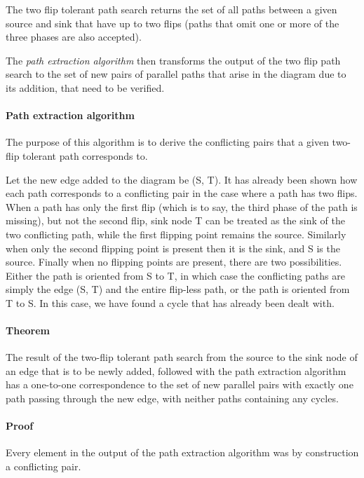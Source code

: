 \documentclass{article}
\begin{document}
The two flip tolerant path search returns the set of all paths between a given source and sink that have up to two flips (paths that omit one or more of the three phases are also accepted).

The \textit{path extraction algorithm} then transforms the output of the two flip path search to the set of new pairs of parallel paths that arise in the diagram due to its addition, that need to be verified.

\paragraph{Path extraction algorithm}
The purpose of this algorithm is to derive the conflicting pairs that a given two-flip tolerant path corresponds to.

Let the new edge added to the diagram be (S, T).
It has already been shown how each path corresponds to a conflicting pair in the case where a path has two flips. When a path has only the first flip (which is to say, the third phase of the path is missing), but not the second flip, sink node T can be treated as the sink of the two conflicting path, while the first flipping point remains the source. Similarly when only the second flipping point is present then it is the sink, and S is the source. Finally when no flipping points are present, there are two possibilities. 
Either the path is oriented from S to T, in which case the conflicting paths are simply the edge (S, T) and the entire flip-less path, or the path is oriented from T to S. In this case, we have found a cycle that has already been dealt with.


\paragraph{Theorem} The result of the two-flip tolerant path search from the source to the sink node of an edge that is to be newly added, followed with the path extraction algorithm has a one-to-one correspondence to the set of new parallel pairs with exactly one path passing through the new edge, with neither paths containing any cycles.

\paragraph{Proof}

Every element in the output of the path extraction algorithm was by construction a conflicting pair.
\end{document}
